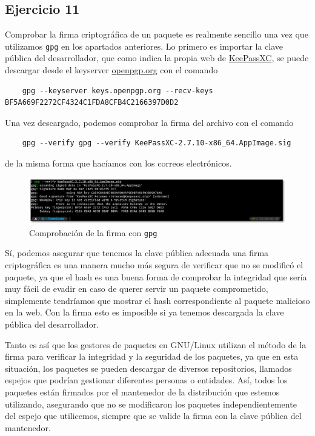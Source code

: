 \subsection{Ejercicio 11}
\graphicspath{ {img/11} }

Comprobar la firma criptográfica de un paquete es realmente sencillo una vez que utilizamos \texttt{gpg} en los apartados anteriores. Lo primero es importar la clave pública del desarrollador, que como indica la propia web de \href{https://keepassxc.org/}{KeePassXC}, se puede descargar desde el keyserver \url{openpgp.org} con el comando

\begin{verbatim}
    gpg --keyserver keys.openpgp.org --recv-keys BF5A669F2272CF4324C1FDA8CFB4C2166397D0D2
\end{verbatim}

Una vez descargado, podemos comprobar la firma del archivo con el comando

\begin{verbatim}
    gpg --verify gpg --verify KeePassXC-2.7.10-x86_64.AppImage.sig
\end{verbatim}

de la misma forma que hacíamos con los correos electrónicos.

\begin{figure}[H]
    \centering
    \includegraphics[width=\textwidth]{keepassxc-signature.png}
    \caption{Comprobación de la firma con \texttt{gpg}}
\end{figure}

Sí, podemos asegurar que tenemos la clave pública adecuada una firma criptográfica es una manera mucho más segura de verificar que no se modificó el paquete, ya que el hash es una buena forma de comprobar la integridad que sería muy fácil de evadir en caso de querer servir un paquete comprometido, simplemente tendríamos que mostrar el hash correspondiente al paquete malicioso en la web. Con la firma esto es imposible si ya tenemos descargada la clave pública del desarrollador.

Tanto es así que los gestores de paquetes en GNU/Linux utilizan el método de la firma para verificar la integridad y la seguridad de los paquetes, ya que en esta situación, los paquetes se pueden descargar de diversos repositorios, llamados espejos que podrían gestionar diferentes personas o entidades. Así, todos los paquetes están firmados por el mantenedor de la distribución que estemos utilizando, asegurando que no se modificaron los paquetes independientemente del espejo que utilicemos, siempre que se valide la firma con la clave pública del mantenedor.